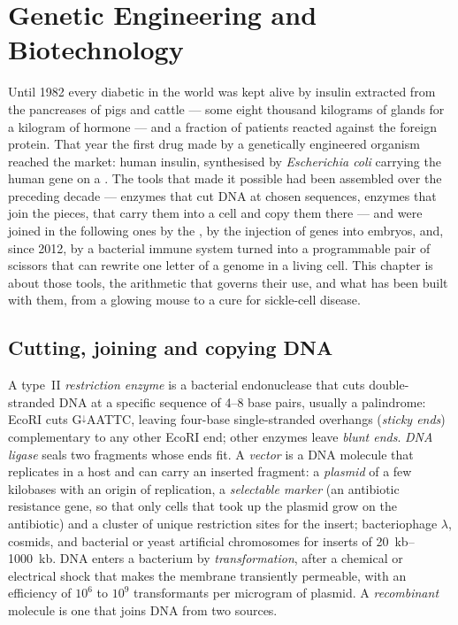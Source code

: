 \chapter{Genetic Engineering and Biotechnology}\label{ch:b3:genetic-engineering}

Until 1982 every diabetic in the world was kept alive by insulin
extracted from the pancreases of pigs and cattle --- some eight
thousand kilograms of glands for a kilogram of hormone --- and a
fraction of patients reacted against the foreign protein. That year
the first drug made by a genetically engineered organism reached the
market: human insulin, synthesised by \emph{Escherichia coli} carrying
the human gene on a . The tools that made it possible had been
assembled over the preceding decade --- enzymes that cut DNA at chosen
sequences, enzymes that join the pieces,  that carry them into
a cell and copy them there --- and were joined in the following ones by
the , by the injection of genes into embryos,
and, since 2012, by a bacterial immune system turned into a
programmable pair of scissors that can rewrite one letter of a genome
in a living cell. This chapter is about those tools, the arithmetic
that governs their use, and what has been built with them, from a
glowing mouse to a cure for sickle-cell disease.

\section{Cutting, joining and copying DNA}

\begin{definition}\label{def:b3:genetic-engineering:tools}
A type~II \emph{restriction enzyme} is a bacterial endonuclease that
cuts double-stranded DNA at a specific sequence of \numrange{4}{8}
base pairs, usually a palindrome: EcoRI cuts G$^{\downarrow}$AATTC,
leaving four-base single-stranded overhangs (\emph{sticky ends})
complementary to any other EcoRI end; other enzymes leave \emph{blunt
ends}. \emph{DNA ligase} seals two fragments whose ends fit. A
\emph{vector} is a DNA molecule that replicates in a host and can carry
an inserted fragment: a \emph{plasmid} of a few kilobases with an
origin of replication, a \emph{selectable marker} (an antibiotic
resistance gene, so that only cells that took up the plasmid grow on
the antibiotic) and a cluster of unique restriction sites for the
insert; bacteriophage $\lambda$, cosmids, and bacterial or yeast
artificial chromosomes for inserts of \qtyrange{20}{1000}{kb}. DNA
enters a bacterium by \emph{transformation}, after a chemical or
electrical shock that makes the membrane transiently permeable, with
an efficiency of $10^{6}$ to $10^{9}$ transformants per microgram of
plasmid. A \emph{recombinant} molecule is one that joins DNA from two
sources.
\end{definition}

